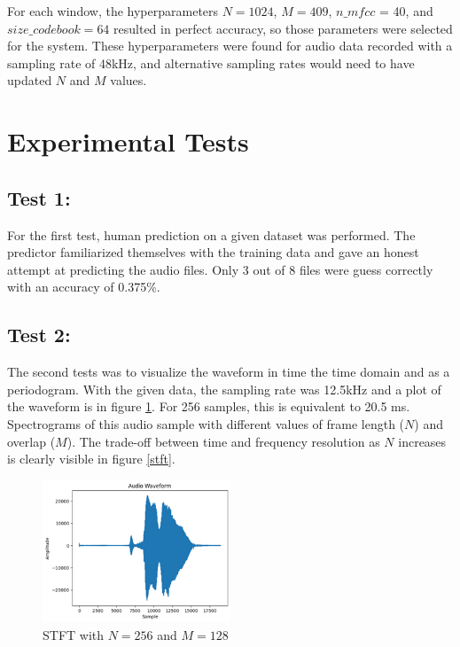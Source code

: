 \documentclass[conference]{IEEEtran}
\begin{document}
    For each window, the hyperparameters $N=1024$, $M=409$, $n\_mfcc$ = 40, and $size\_codebook = 64$ resulted in perfect accuracy, so those parameters were selected for the system. These hyperparameters were found for audio data recorded with a sampling rate of 48kHz, and alternative sampling rates would need to have updated $N$ and $M$ values.

\section{Experimental Tests}
    \subsection*{Test 1:}
    For the first test, human prediction on a given dataset was performed. The predictor familiarized themselves with the training data and gave an honest attempt at predicting the audio files. Only 3 out of 8 files were guess correctly with an accuracy of 0.375\%.

    \subsection*{Test 2:}
    The second tests was to visualize the waveform in time the time domain and as a periodogram. With the given data, the sampling rate was 12.5kHz and a plot of the waveform is in figure \ref{wave}. For 256 samples, this is equivalent to 20.5 ms. Spectrograms of this audio sample with different values of frame length ($N$) and overlap ($M$). The trade-off between time and frequency resolution as $N$ increases is clearly visible in figure \ref{stft}.

    \begin{figure}[!h]
        \centering
        \includegraphics[width=0.5\textwidth]{audiowave.png}
        \caption{STFT with $N=256$ and $M=128$}
        \label{wave}
    \end{figure}
\end{document}
